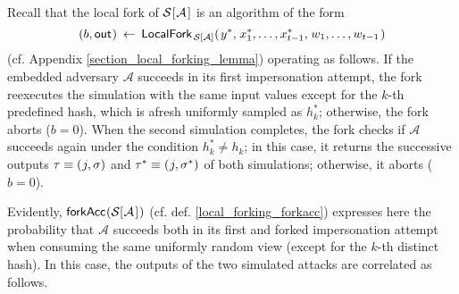 \documentclass[10pt, psamsfonts, reqno]{amsart}
\theoremstyle{definition}
\theoremstyle{remark}
\numberwithin{equation}{section}
\begin{document}
Recall that the local fork of
$\mathcal{S}\hspace{0.5pt}[\hspace{0.5pt}\mathcal{A}\hspace{1pt}]$
is an algorithm of the form
\vspace{5pt}
\begin{equation*}
(
	\vspace{1pt}
	b,
	\vspace{1pt}
	\mathsf{out}
	\hspace{0.5pt}
)
\hspace{2pt}
\leftarrow
\hspace{2pt}
\mathsf{LocalFork}_{
		\hspace{1pt}
    	\mathcal{S}\hspace{0pt}[
    		\hspace{0pt}
    		\mathcal{A}
    		\hspace{0pt}
    	]
    }
	(
   		\hspace{1pt}
		y ^*,
		\hspace{1pt}
		x_1^*, \dots, x_{t-1}^*,
		\hspace{1pt}
		w_1, \dots, w_{t-1}
		\hspace{1pt}
   	)
\vspace{5pt}
\end{equation*}
(cf. Appendix \ref{section_local_forking_lemma})
operating as follows.
If the embedded adversary $\mathcal{A}$
succeeds in its first
impersonation attempt,
the fork reexecutes the simulation
with the same input values except
for the $k$-th predefined hash,
which is afresh uniformly sampled as $h_k^*$;
otherwise, the fork aborts ($b=0$).
When the second simulation completes,
the fork checks if $\mathcal{A}$
succeeds again under the condition $h_k^* \neq h_k$;
in this case, it returns the successive outputs
$\tau \equiv (\hspace{0.5pt}j, \sigma)$
and $\tau^* \equiv (\hspace{0.5pt}j, \sigma^*)$
of both simulations; otherwise, it aborts ($b=0$).

Evidently,
$
\mathsf{forkAcc}
\hspace{0.5pt}
(
	\mathcal{S}
	[
		\hspace{0.5pt}
		\mathcal{A}
		\hspace{1pt}
	]
	\hspace{0.5pt}
)
$
(cf. def. \eqref{local_forking_forkacc})
expresses here the probability that $\mathcal{A}$
succeeds both in its first and forked impersonation attempt
when consuming the same uniformly random
view (except for the $k$-th distinct hash).
In this case,
the outputs of the two simulated attacks are correlated as follows.
\end{document}
